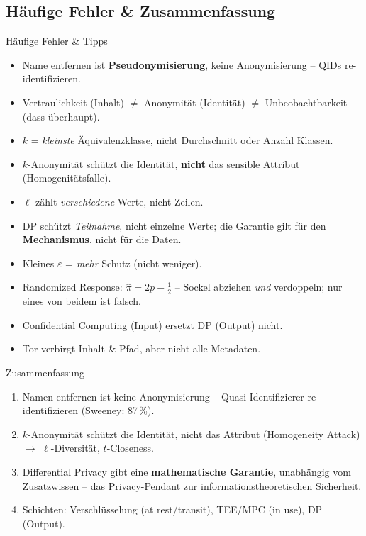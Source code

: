\documentclass[a4paper, fontsize=7pt]{scrartcl}
\begin{document}
\subsection{Häufige Fehler \& Zusammenfassung}

\begin{subbox}{Häufige Fehler \& Tipps}
\begin{itemize}
    \item Name entfernen ist \textbf{Pseudonymisierung}, keine
          Anonymisierung -- QIDs re-identifizieren.
    \item Vertraulichkeit (Inhalt) $\neq$ Anonymität (Identität) $\neq$
          Unbeobachtbarkeit (dass überhaupt).
    \item $k$ = \emph{kleinste} Äquivalenzklasse, nicht Durchschnitt oder
          Anzahl Klassen.
    \item $k$-Anonymität schützt die Identität, \textbf{nicht} das
          sensible Attribut (Homogenitätsfalle).
    \item $\ell$ zählt \emph{verschiedene} Werte, nicht Zeilen.
    \item DP schützt \emph{Teilnahme}, nicht einzelne Werte; die Garantie
          gilt für den \textbf{Mechanismus}, nicht für die Daten.
    \item Kleines $\varepsilon$ = \emph{mehr} Schutz (nicht weniger).
    \item Randomized Response: $\hat{\pi} = 2p - \tfrac12$ -- Sockel
          abziehen \emph{und} verdoppeln; nur eines von beidem ist falsch.
    \item Confidential Computing (Input) ersetzt DP (Output) nicht.
    \item Tor verbirgt Inhalt \& Pfad, aber nicht alle Metadaten.
\end{itemize}
\end{subbox}

\begin{subbox}{Zusammenfassung}
\begin{enumerate}
    \item Namen entfernen ist keine Anonymisierung -- Quasi-Identifizierer
          re-identifizieren (Sweeney: 87\,\%).
    \item $k$-Anonymität schützt die Identität, nicht das Attribut
          (Homogeneity Attack) $\to$ $\ell$-Diversität, $t$-Closeness.
    \item Differential Privacy gibt eine \textbf{mathematische Garantie},
          unabhängig vom Zusatzwissen -- das Privacy-Pendant zur
          informationstheoretischen Sicherheit.
    \item Schichten: Verschlüsselung (at rest/transit), TEE/MPC (in use),
          DP (Output).
\end{enumerate}
\end{subbox}
\end{document}
